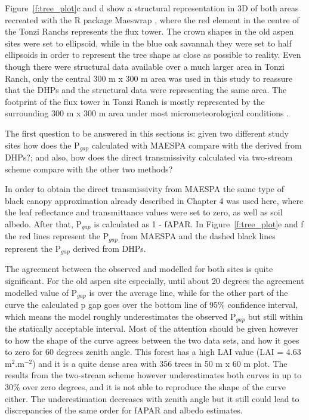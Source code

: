 Figure~\ref{f:tree_plot}c and d show a structural representation in 3D of both areas recreated with the R package Maeswrap \citep{Duursma2015}, where the red element in the centre of the Tonzi Ranch\textquotesingle s represents the flux tower. The crown shapes in the old aspen sites were set to ellipsoid, while in the blue oak savannah they were set to half ellipsoids in order to represent the tree shape as close as possible to reality. Even though there were structural data available over a much larger area in Tonzi Ranch, only the central 300 m x 300 m area was used in this study to reassure that the DHPs and the structural data were representing the same area. The footprint of the flux tower in Tonzi Ranch is mostly represented by the surrounding 300 m x 300 m area under most micrometeorological conditions \citep{Baldocchi2006}.

The first question to be answered in this sections is: given two different study sites how does the P$_{gap}$ calculated with MAESPA compare with the derived from DHPs?; and also, how does the direct transmissivity calculated via two-stream scheme compare with the other two methods?

In order to obtain the direct transmissivity from MAESPA the same type of black canopy approximation already described in Chapter 4 was used here, where the leaf reflectance and transmittance values were set to zero, as well as soil albedo. After that, P$_{gap}$ is calculated as 1 - fAPAR. In Figure~\ref{f:tree_plot}e and f the red lines represent the P$_{gap}$ from MAESPA and the dashed black lines represent the P$_{gap}$ derived from DHPs.

The agreement between the observed and modelled for both sites is quite significant. For the old aspen site especially, until about 20 degrees the agreement modelled value of P$_{gap}$ is over the average line, while for the other part of the curve the calculated p gap goes over the bottom line of 95\% confidence interval, which means the model roughly underestimates the observed P$_{gap}$ but still within the statically acceptable interval. Most of the attention should be given however to how the shape of the curve agrees between the two data sets, and how it goes to zero for 60 degrees zenith angle. This forest has a high LAI value (LAI = 4.63 m$^{2}$.m$^{-2}$) and it is a quite dense area with 356 trees in 50 m x 60 m plot. The results from the two-stream scheme however underestimates both curves in up to 30\% over zero degrees, and it is not able to reproduce the shape of the curve either. The underestimation decreases with zenith angle but it still could lead to discrepancies of the same order for fAPAR and albedo estimates.

